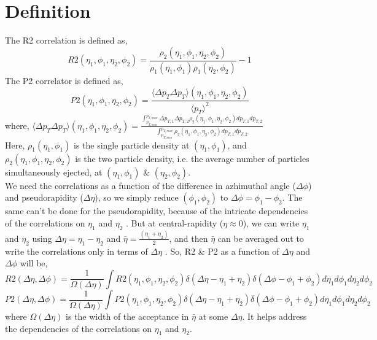 \documentclass[12pt,a4paper,twoside]{report}
\begin{document}
\section{Definition}
The R2 correlation  is defined as,
\begin{equation}\label{eq:R2(e1p1e2p2)}
	R2(\eta_1,\phi_1,\eta_2,\phi_2)=\frac{\rho_2(\eta_1,\phi_1,\eta_2,\phi_2)}{\rho_1(\eta_1,\phi_1)\rho_1(\eta_2,\phi_2)}-1
\end{equation}
The P2 correlator is defined as,
\begin{equation}\label{eq:P2(e1p1e2p2)}
	P2(\eta_1,\phi_1,\eta_2,\phi_2)=\frac{\langle\Delta p_T \Delta p_T \rangle(\eta_1,\phi_1,\eta_2,\phi_2)}{\langle p_T\rangle^2}
\end{equation}
	where, $\langle\Delta p_T \Delta p_T\rangle(\eta_1,\phi_1,\eta_2,\phi_2)=\frac{\int_{p_{T,min}}^{p_{T,max}}\Delta p_{T,1}\Delta p_{T,2}\rho_2(\eta_1,\phi_1,\eta_2,\phi_2)d p_{T,1}d p_{T,2}}{\int_{p_{T,min}}^{p_{T,max}}\rho_2(\eta_1,\phi_1,\eta_2,\phi_2)d p_{T,1}d p_{T,2}}$\\

Here, $\rho_1(\eta_1,\phi_1)$ is the single particle density at $(\eta_1,\phi_1)$, and $\rho_2(\eta_1,\phi_1,\eta_2,\phi_2)$ is the two particle density, i.e. the average number of particles simultaneously ejected, at $(\eta_1,\phi_1)$ \& $(\eta_2,\phi_2)$.\\

We need the correlations as a function of the difference in azhimuthal angle ($\Delta\phi$) and pseudorapidity ($\Delta\eta$), so we simply reduce $(\phi_1,\phi_2)$ to $\Delta\phi=\phi_1-\phi_2$. The same can't be done for the pseudorapidity, because of the intricate dependencies of the correlations on $\eta_1$ and $\eta_2$ \cite{Ref:etadep-paper1}\cite{Ref:etadep-paper2}. But at central-rapidity ($\eta\approx0$), we can write $\eta_1$ and $\eta_2$ using $\Delta\eta=\eta_1-\eta_2$ and $\bar{\eta}=\frac{(\eta_1+\eta_2)}{2}$, and then $\bar{\eta}$ can be averaged out to write the correlations only in terms of $\Delta\eta$ \cite{Ref:deta-paper}. So, R2 \& P2 as a function of $\Delta\eta$ and $\Delta\phi$ will be,
\begin{equation}\label{eq:R2(dedp)}
	R2(\Delta\eta,\Delta\phi)=\frac{1}{\Omega(\Delta\eta)}\int R2(\eta_1,\phi_1,\eta_2,\phi_2)\delta(\Delta\eta-\eta_1+\eta_2)\delta(\Delta\phi-\phi_1+\phi_2)d\eta_1 d\phi_1 d\eta_2 d\phi_2
\end{equation}
\begin{equation}\label{eq:P2(dedp)}
	P2(\Delta\eta,\Delta\phi)=\frac{1}{\Omega(\Delta\eta)}\int P2(\eta_1,\phi_1,\eta_2,\phi_2)\delta(\Delta\eta-\eta_1+\eta_2)\delta(\Delta\phi-\phi_1+\phi_2)d\eta_1 d\phi_1 d\eta_2 d\phi_2
\end{equation}
where $\Omega(\Delta\eta)$ is the width of the acceptance in $\bar{\eta}$ at some $\Delta\eta$. It helps address the dependencies of the correlations on $\eta_1$ and $\eta_2$.\\
\end{document}
